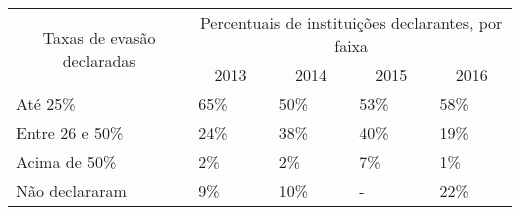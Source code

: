 \begin{table}[]
  \begin{tabular}{|l|l|l|l|l|}
  \hline
  \multicolumn{1}{|c|}{\multirow{2}{*}{Taxas de evasão declaradas}} & \multicolumn{4}{c|}{Percentuais de instituições declarantes, por faixa}                                       \\ \cline{2-5}
  \multicolumn{1}{|c|}{}                                            & \multicolumn{1}{c|}{2013} & \multicolumn{1}{c|}{2014} & \multicolumn{1}{c|}{2015} & \multicolumn{1}{c|}{2016} \\ \hline
  Até 25\%                                                          & 65\%                      & 50\%                      & 53\%                      & 58\%                      \\ \hline
  Entre 26 e 50\%                                                   & 24\%                      & 38\%                      & 40\%                      & 19\%                      \\ \hline
  Acima de 50\%                                                     & 2\%                       & 2\%                       & 7\%                       & 1\%                       \\ \hline
  Não declararam                                                    & 9\%                       & 10\%                      & -                         & 22\%                      \\ \hline
  \end{tabular}
\end{table}